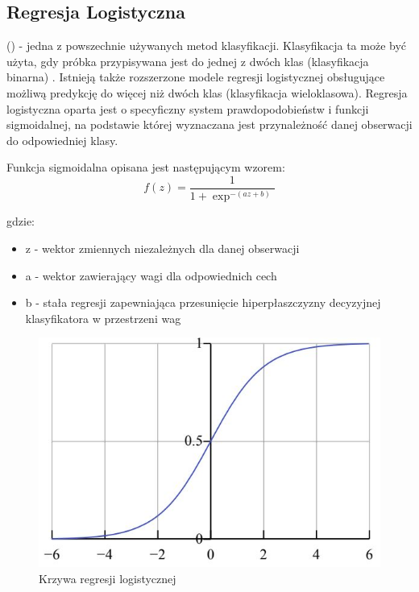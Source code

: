 \newpage

\subsection{Regresja Logistyczna}
 () - jedna z powszechnie używanych metod klasyfikacji. Klasyfikacja ta może być użyta, gdy próbka przypisywana jest do jednej z dwóch klas (klasyfikacja binarna) \cite{PPlonski}. Istnieją także rozszerzone modele regresji logistycznej obsługujące możliwą predykcję do więcej niż dwóch klas (klasyfikacja wieloklasowa). Regresja logistyczna oparta jest o specyficzny system prawdopodobieństw i funkcji sigmoidalnej, na podstawie której wyznaczana jest przynależność danej obserwacji do odpowiedniej klasy.

Funkcja sigmoidalna opisana jest następującym wzorem:
\begin{equation}
    f(z) = \frac{1}{1 + \exp^{-(az + b)}}
\end{equation}

gdzie:
\begin{itemize}
    \item z - wektor zmiennych niezależnych dla danej obserwacji
    \item a - wektor zawierający wagi dla odpowiednich cech
    \item b - stała regresji zapewniająca przesunięcie hiperpłaszczyzny decyzyjnej klasyfikatora w przestrzeni wag
\end{itemize}

\begin{figure}[h] 
        \centering\includegraphics[width=15cm]{figures/sigmoidFunc.JPG}
        \caption{Krzywa regresji logistycznej \cite{MGrzyb}}
\end{figure}

